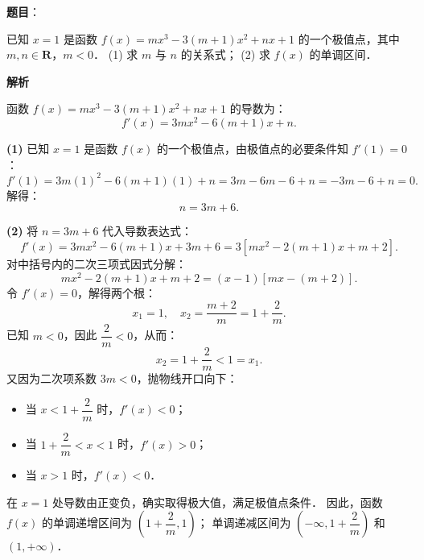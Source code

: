 \begin{answer}

\textbf{题目}：

已知 $x = 1$ 是函数 $f(x) = mx^3 - 3(m+1)x^2 + nx + 1$ 的一个极值点，其中 $m, n \in \mathbf{R}$，$m < 0$．
(1) 求 $m$ 与 $n$ 的关系式；
(2) 求 $f(x)$ 的单调区间．

\textbf{解析}

函数 $f(x) = mx^3 - 3(m+1)x^2 + nx + 1$ 的导数为：
\nopagebreak[4]
\[
f'(x) = 3mx^2 - 6(m+1)x + n.
\]

\textbf{(1)}
已知 $x = 1$ 是函数 $f(x)$ 的一个极值点，由极值点的必要条件知 $f'(1) = 0$：
\nopagebreak[4]
\[
f'(1) = 3m(1)^2 - 6(m+1)(1) + n = 3m - 6m - 6 + n = -3m - 6 + n = 0.
\]
解得：
\nopagebreak[4]
\[
n = 3m + 6.
\]

\textbf{(2)}
将 $n = 3m + 6$ 代入导数表达式：
\nopagebreak[4]
\[
f'(x) = 3mx^2 - 6(m+1)x + 3m + 6 = 3\left[mx^2 - 2(m+1)x + m + 2\right].
\]
对中括号内的二次三项式因式分解：
\nopagebreak[4]
\[
mx^2 - 2(m+1)x + m + 2 = (x - 1)[mx - (m+2)].
\]
令 $f'(x) = 0$，解得两个根：
\nopagebreak[4]
\[
x_1 = 1, \quad x_2 = \dfrac{m+2}{m} = 1 + \dfrac{2}{m}.
\]
已知 $m < 0$，因此 $\dfrac{2}{m} < 0$，从而：
\nopagebreak[4]
\[
x_2 = 1 + \dfrac{2}{m} < 1 = x_1.
\]
又因为二次项系数 $3m < 0$，抛物线开口向下：
\begin{itemize}
\item 当 $x < 1 + \dfrac{2}{m}$ 时，$f'(x) < 0$；
\item 当 $1 + \dfrac{2}{m} < x < 1$ 时，$f'(x) > 0$；
\item 当 $x > 1$ 时，$f'(x) < 0$．
\end{itemize}

在 $x = 1$ 处导数由正变负，确实取得极大值，满足极值点条件．
因此，函数 $f(x)$ 的单调递增区间为 $\left(1 + \dfrac{2}{m}, 1\right)$；
单调递减区间为 $\left(-\infty, 1 + \dfrac{2}{m}\right)$ 和 $(1, +\infty)$．



\end{answer}
